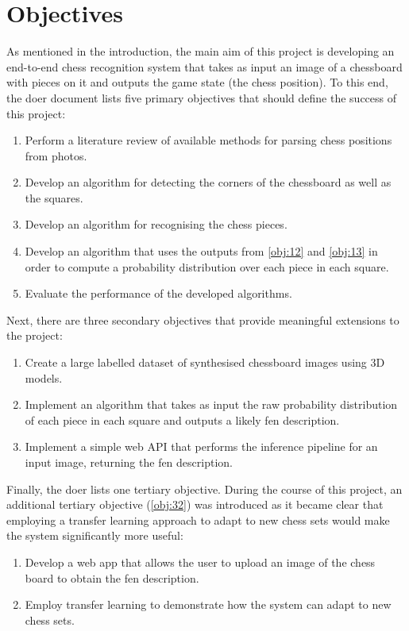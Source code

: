 \section{Objectives}
\label{sec:objectives}
As mentioned in the introduction, the main aim of this project is developing an end-to-end chess recognition system that takes as input an image of a chessboard with pieces on it and outputs the game state (the chess position).
To this end, the \gls{doer} document lists five primary objectives that should define the success of this project:
\begin{enumerate}[label={A\arabic*.},ref={A\arabic*}]
    \item \label{obj:11} Perform a literature review of available methods for parsing chess positions from photos.
    \item \label{obj:12} Develop an algorithm for detecting the corners of the chessboard as well as the squares.
    \item \label{obj:13} Develop an algorithm for recognising the chess pieces.
    \item \label{obj:14} Develop an algorithm that uses the outputs from \ref{obj:12} and \ref{obj:13} in order to compute a probability distribution over each piece in each square.
    \item \label{obj:15} Evaluate the performance of the developed algorithms.
\end{enumerate}

Next, there are three secondary objectives that provide meaningful extensions to the project:
\begin{enumerate}[label={B\arabic*.},ref={B\arabic*}]
    \item \label{obj:21} Create a large labelled dataset of synthesised chessboard images using 3D models.
    \item \label{obj:22} Implement an algorithm that takes as input the raw probability distribution of each piece in each square and outputs a likely \gls{fen} description.
    \item \label{obj:23} Implement a simple web API that performs the inference pipeline for an input image, returning the \gls{fen} description. 
\end{enumerate}

Finally, the \gls{doer} lists one tertiary objective. 
During the course of this project, an additional tertiary objective (\ref{obj:32}) was introduced as it became clear that employing a transfer learning approach to adapt to new chess sets would make the system significantly more useful:
\begin{enumerate}[label={C\arabic*.},ref={C\arabic*}]
    \item \label{obj:31} Develop a web app that allows the user to upload an image of the chess board to obtain the \gls{fen} description.
    \item \label{obj:32} Employ transfer learning to demonstrate how the system can adapt to new chess sets.
\end{enumerate}

